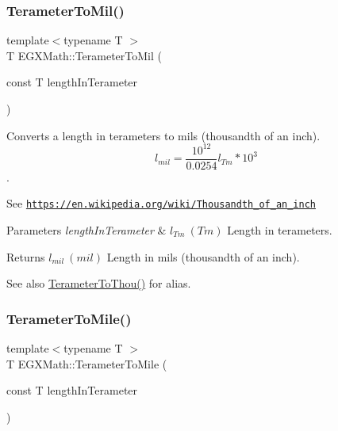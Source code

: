 \subsubsection{\texorpdfstring{Terameter\+To\+Mil()}{TerameterToMil()}}
{\footnotesize\ttfamily template$<$typename T $>$ \\
T E\+G\+X\+Math\+::\+Terameter\+To\+Mil (\begin{DoxyParamCaption}\item[{const T}]{length\+In\+Terameter }\end{DoxyParamCaption})}



Converts a length in terameters to mils (thousandth of an inch). \[ l_{mil}= \frac{10^{12}}{0.0254} l_{Tm} * 10^{3} \]. 

See \href{https://en.wikipedia.org/wiki/Thousandth_of_an_inch}{\tt https\+://en.\+wikipedia.\+org/wiki/\+Thousandth\+\_\+of\+\_\+an\+\_\+inch} 
\begin{DoxyParams}{Parameters}
{\em length\+In\+Terameter} & $ l_{Tm}\ (Tm)$ Length in terameters. \\
\hline
\end{DoxyParams}
\begin{DoxyReturn}{Returns}
$ l_{mil}\ (mil)$ Length in mils (thousandth of an inch). 
\end{DoxyReturn}
\begin{DoxySeeAlso}{See also}
\mbox{\hyperlink{group___e_g_x_math-_conversions-_length_conversions-_terameter-_imperial_ga3e00f52eb5c96d53031f36d7003a0e5e}{Terameter\+To\+Thou()}} for alias. 
\end{DoxySeeAlso}
\mbox{\label{group___e_g_x_math-_conversions-_length_conversions-_terameter-_imperial_ga51468f3ffd5925fb2cbb188d49b6aa60}} 
\subsubsection{\texorpdfstring{Terameter\+To\+Mile()}{TerameterToMile()}}
{\footnotesize\ttfamily template$<$typename T $>$ \\
T E\+G\+X\+Math\+::\+Terameter\+To\+Mile (\begin{DoxyParamCaption}\item[{const T}]{length\+In\+Terameter }\end{DoxyParamCaption})}



